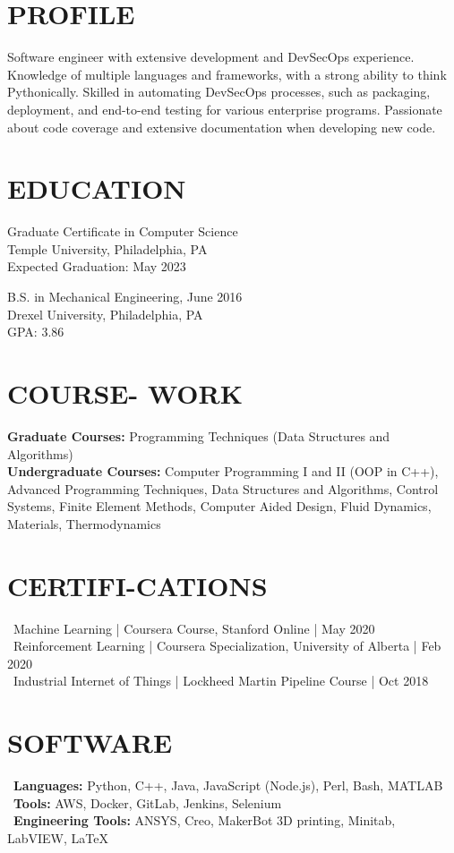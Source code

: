 \documentclass[line,resmargin,11pt]{res}
\begin{document}
\begin{resume}

\section{PROFILE}
Software engineer with extensive development and DevSecOps experience. Knowledge of multiple languages and frameworks, with a strong ability to think Pythonically. Skilled in automating DevSecOps processes, such as packaging, deployment, and end-to-end testing for various enterprise programs. Passionate about code coverage and extensive documentation when developing new code.
 
\section{EDUCATION}
Graduate Certificate in Computer Science \\
Temple University, Philadelphia, PA \\
Expected Graduation: May 2023

B.S. in Mechanical Engineering, June 2016 \\
Drexel University, Philadelphia, PA \\
GPA: 3.86

\section{COURSE- WORK}
	\textbf{Graduate Courses:} Programming Techniques (Data Structures and Algorithms) \\
	\textbf{Undergraduate Courses:} Computer Programming I and II (OOP in C++), Advanced Programming Techniques, Data Structures and Algorithms, Control Systems, Finite Element Methods, Computer Aided Design, Fluid Dynamics, Materials, Thermodynamics

\section{CERTIFI-CATIONS}
	\textbullet\ Machine Learning | Coursera Course, Stanford Online | May 2020 \\
	\textbullet\ Reinforcement Learning | Coursera Specialization, University of Alberta | Feb 2020 \\
	\textbullet\ Industrial Internet of Things | Lockheed Martin Pipeline Course | Oct 2018

\section{SOFTWARE}
\textbullet\ \textbf{Languages:} Python, C++, Java, JavaScript (Node.js), Perl, Bash, MATLAB  \\
\textbullet\ \textbf{Tools:} AWS, Docker, GitLab, Jenkins, Selenium \\
\textbullet\ \textbf{Engineering Tools:} ANSYS, Creo, MakerBot 3D printing, Minitab, LabVIEW, \LaTeX        
 

\end{resume}
\end{document}
